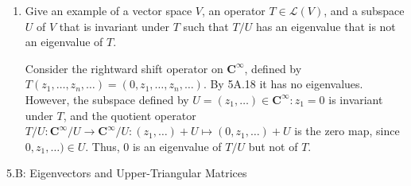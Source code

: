 \documentclass{book}
\begin{document}
\begin{enumerate}
\item Give an example of a vector space \(V\), an operator \(T \in \mathcal{L}(V)\), and a subspace \(U\) of \(V\) that is invariant under \(T\) such that \(T/U\) has an eigenvalue that is not an eigenvalue of \(T\).

Consider the rightward shift operator on \(\textbf{C}^{\infty}\), defined by \(T(z_1,\dots,z_n,\dots)=(0,z_1,\dots,z_n,\dots)\).  By 5A.18 it has no eigenvalues.  However, the subspace defined by \(U={(z_1,\dots) \in \textbf{C}^{\infty}}:z_1=0\) is invariant under \(T\), and the quotient operator \(T/U:\textbf{C}^{\infty}/U \rightarrow \textbf{C}^{\infty}/U: (z_1,\dots)+U \mapsto (0,z_1,\dots)+U\) is the zero map, since \(0,z_1,\dots) \in U\).  Thus, \(0\) is an eigenvalue of \(T/U\) but not of \(T\).

\end{enumerate}

5.B: Eigenvectors and Upper-Triangular Matrices
\end{document}
